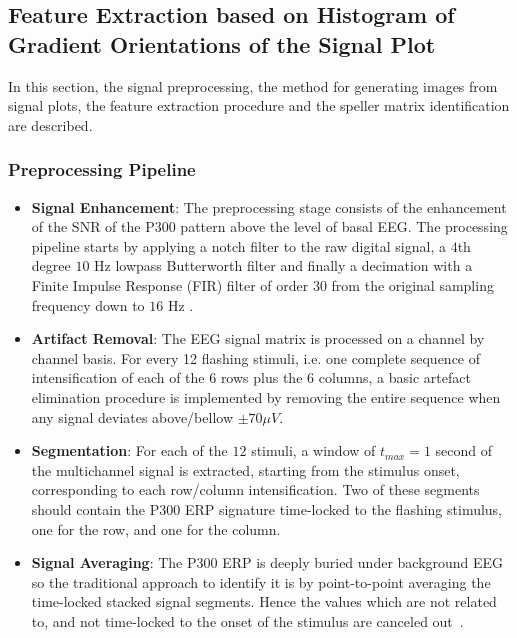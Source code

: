 \documentclass[entropy,article,submit,moreauthors,pdftex,10pt,a4paper]{mdpi}
\begin{document}
\subsection{Feature Extraction based on Histogram of Gradient Orientations of the Signal Plot} \label{Feature}

In this section, the signal preprocessing, the method for generating images from signal plots, the feature extraction procedure and the speller matrix identification are described. 

\subsubsection{Preprocessing Pipeline} \label{Pipeline}

\begin{itemize}
\item \textbf{Signal Enhancement}: The preprocessing stage consists of the enhancement of the SNR of the P300 pattern above the level of basal EEG. The processing pipeline starts by applying a notch filter to the raw digital signal, a 
$4$th degree $10$ Hz lowpass Butterworth filter and finally a decimation with a Finite Impulse Response (FIR) filter of order $30$ from the original sampling frequency down to $16$ Hz \citep{Krusienski2006}.
\item \textbf{Artifact Removal}: The EEG signal matrix is processed on a channel by channel basis.   For every 12 flashing stimuli, i.e. one complete sequence of intensification of each of the $6$ rows plus the $6$ columns, a basic artefact elimination procedure is implemented by removing the entire sequence when any signal deviates above/bellow $ \pm 70 \mu V $.
\item \textbf{Segmentation}: For each of the $12$ stimuli,  a window of $t_{max} = 1$ second of the multichannel signal is extracted, starting from the stimulus onset, corresponding to each row/column intensification.  Two of these segments should contain the P300 ERP signature time-locked to the flashing stimulus, one for the row, and one for the column.
\item \textbf{Signal Averaging}:  The P300 ERP is deeply buried under background EEG so the traditional approach to identify it is by point-to-point averaging the time-locked stacked signal segments.  Hence the values which are not related to, and not time-locked to the onset of the stimulus are canceled out~\citep{Liang2008}. 
\end{itemize}
\end{document}

